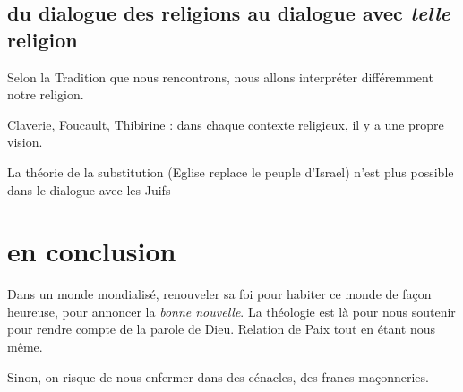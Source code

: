 \subsection{du dialogue des religions au dialogue avec \textit{telle} religion}

Selon la Tradition que nous rencontrons, nous allons interpréter différemment notre religion. 
\begin{Ex}
Claverie, Foucault, Thibirine : dans chaque contexte religieux, il y a une propre vision.
\end{Ex}
\begin{Ex}
La théorie de la substitution (Eglise replace le peuple d'Israel) n'est plus possible dans le dialogue avec les Juifs
\end{Ex}

\section{en conclusion}
\begin{Synthesis}
Dans un monde mondialisé, renouveler sa foi pour habiter ce monde de façon heureuse, pour annoncer la \textit{bonne nouvelle}.
La théologie est là pour nous soutenir pour rendre compte de la parole de Dieu. Relation de Paix tout en étant nous même.
\end{Synthesis}
Sinon, on risque de nous enfermer dans des cénacles, des francs maçonneries.
